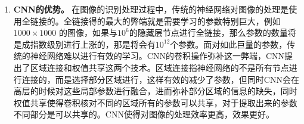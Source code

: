 \begin{enumerate}

\item \textbf{CNN的优势。} 在图像的识别处理过程中，传统的神经网络对图像的处理是使用全链接的。全链接得的最大的弊端就是需要学习的参数特别巨大，例如$1000 \times 1000$ 的图像，如果与$10^6$的隐藏层节点进行全链接，那么参数的数量将是成指数级别进行上涨的，那是将会有$10^{12}$个参数。面对如此巨量的参数，传统的神经网络难以进行有效的学习。CNN的卷积操作弥补这一弊端，CNN提出了区域连接和权值共享这两个技术。区域连接指神经网络的不是所有节点进行连接的，而是选择部分区域进行，这样有效的减少了参数，但同时CNN会在高层的时候对这些局部参数进行融合，进而弥补部分区域的信息的缺失，同时权值共享使得卷积核对不同的区域所有的参数可以共享，对于提取出来的参数不同部分是可以共享的。CNN使得对图像的处理效率更高，效果更好。


\end{enumerate}

